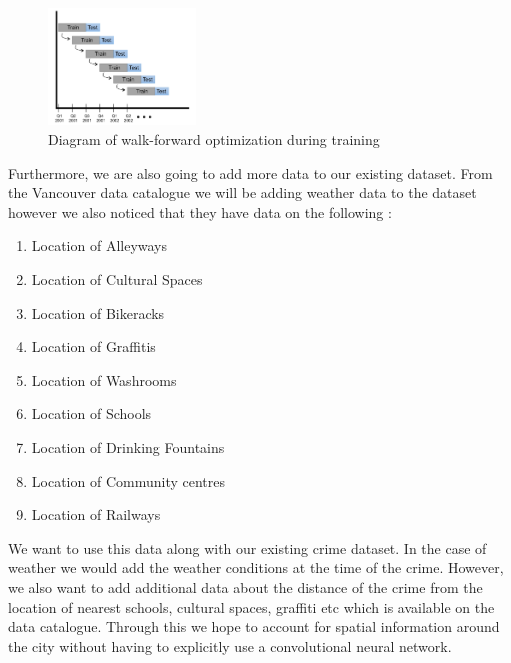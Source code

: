 \documentclass[conference]{IEEEtran}
\begin{document}
    \begin{figure}[H]
        \centering
        \captionsetup{justification=centering}
        \centering
            \includegraphics[width=0.35\textwidth]{train.png}
            \caption{Diagram of walk-forward optimization during training \cite{ref}}
    \end{figure}

    Furthermore, we are also going to add more data to our existing dataset. From the Vancouver data catalogue we will be adding weather data to the dataset however we also noticed
    that they have data on the following \cite{DT}:\\

    \begin{enumerate}
        \item Location of Alleyways
        \item Location of Cultural Spaces
        \item Location of Bikeracks
        \item Location of Graffitis
        \item Location of Washrooms
        \item Location of Schools
        \item Location of Drinking Fountains
        \item Location of Community centres
        \item Location of Railways\\
    \end{enumerate}
    
    We want to use this data along with our existing crime dataset. In the case of weather we would add the weather conditions at the time of the crime. However, we also want to add additional
    data about the distance of the crime from the location of nearest schools, cultural spaces, graffiti etc which is available on the data catalogue. Through this we hope to account for spatial information
    around the city without having to explicitly use a convolutional neural network.

    \newpage

    
    
\end{document}

